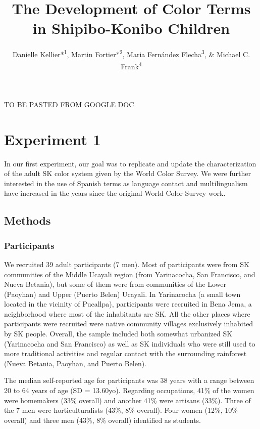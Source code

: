 \documentclass[,man,floatsintext]{apa6}
\title{The Development of Color Terms in Shipibo-Konibo Children}
\author{Danielle Kellier*\textsuperscript{1}, Martin
Fortier*\textsuperscript{2}, Maria Fernández Flecha\textsuperscript{3},
\& Michael C. Frank\textsuperscript{4}}
\date{}
\affiliation{
\vspace{0.5cm}
\textsuperscript{1} University of Pennsylvania\\\textsuperscript{2} PSL Research University\\\textsuperscript{3} Pontificia Universidad Católica del Perú\\\textsuperscript{4} Stanford University}
\theoremstyle{definition}
\theoremstyle{definition}
\theoremstyle{definition}
\theoremstyle{remark}
\begin{document}
\maketitle

TO BE PASTED FROM GOOGLE DOC

\section{Experiment 1}\label{experiment-1}

In our first experiment, our goal was to replicate and update the
characterization of the adult SK color system given by the World Color
Survey. We were further interested in the use of Spanish terms as
language contact and multilingualism have increased in the years since
the original World Color Survey work.

\subsection{Methods}\label{methods}

\subsubsection{Participants}\label{participants}

We recruited 39 adult participants (7 men). Most of participants were
from SK communities of the Middle Ucayali region (from Yarinacocha, San
Francisco, and Nueva Betania), but some of them were from communities of
the Lower (Paoyhan) and Upper (Puerto Belen) Ucayali. In Yarinacocha (a
small town located in the vicinity of Pucallpa), participants were
recruited in Bena Jema, a neighborhood where most of the inhabitants are
SK. All the other places where participants were recruited were native
community villages exclusively inhabited by SK people. Overall, the
sample included both somewhat urbanized SK (Yarinacocha and San
Francisco) as well as SK individuals who were still used to more
traditional activities and regular contact with the surrounding
rainforest (Nueva Betania, Paoyhan, and Puerto Belen).

The median self-reported age for participants was 38 years with a range
between 20 to 64 years of age (SD = 13.60yo). Regarding occupations,
41\% of the women were homemakers (33\% overall) and another 41\% were
artisans (33\%). Three of the 7 men were horticulturalists (43\%, 8\%
overall). Four women (12\%, 10\% overall) and three men (43\%, 8\%
overall) identified as students.
\end{document}
